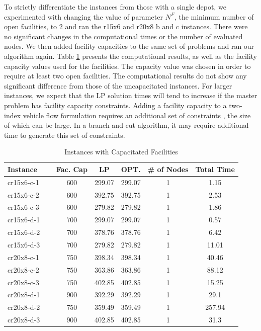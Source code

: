To strictly differentiate the instances from those with a single
depot, we experimented with changing the value of parameter $N^F$, the
minimum number of open facilities, to 2 and ran the r15x6 and r20x8 b
and c instances. There were no significant changes in the
computational times or the number of evaluated nodes. We then added
facility capacities to the same set of problems and ran our algorithm
again. Table \ref{gr4-fc} presents the computational results, as well
as the facility capacity values used for the facilities. The capacity
value was chosen in order to require at least two open facilities. The
computational results do not show any significant difference from
those of the uncapacitated instances. For larger instances, we expect
that the LP solution times will tend to increase if the master problem
has facility capacity constraints. Adding a facility capacity to a
two-index vehicle flow formulation requires an additional set of
constraints \citep{Belenguer}, the size of which can be large.
In a branch-and-cut algorithm, it may require additional time to
generate this set of constraints.
\begin{table}[ht]
\centering
\caption{Instances with Capacitated Facilities}\label{gr4-fc}
\begin {tabular}[t]{|l|c|c|c|c|c|}  
\hline
Instance & Fac. Cap & LP & OPT. & \# of Nodes & Total Time \\\hline
cr15x6-c-1 \ \	&	600	&	299.07	&	299.07	&	1	&	1.15	\\
cr15x6-c-2 \ \	&	600	&	392.75	&	392.75	&	1	&	2.53	\\
cr15x6-c-3 \ \	&	600	&	279.82	&	279.82	&	1	&	1.86	\\
cr15x6-d-1 \ \	&	700	&	299.07	&	299.07	&	1	&	0.57	\\
cr15x6-d-2 \ \	&	700	&	378.76	&	378.76	&	1	&	6.42	\\
cr15x6-d-3 \ \	&	700	&	279.82	&	279.82	&	1	&	11.01	\\
cr20x8-c-1 \ \	&	750	&	398.34	&	398.34	&	1	&	40.46	\\
cr20x8-c-2 \ \	&	750	&	363.86	&	363.86	&	1	&	88.12	\\
cr20x8-c-3 \ \	&	750	&	402.85	&	402.85	&	1	&	15.25	\\
cr20x8-d-1 \ \	&	900	&	392.29	&	392.29	&	1	&	29.1	\\
cr20x8-d-2 \ \	&	750	&	359.49	&	359.49	&	1	&	257.94	\\
cr20x8-d-3 \ \	&	900	&	402.85	&	402.85	&	1	&	31.3	\\\hline
\end{tabular}
\end{table} 

